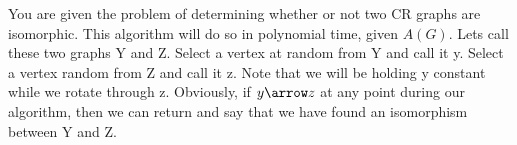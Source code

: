 \documentclass{article}
\begin{document}
You are given the problem of determining whether or not two CR graphs are isomorphic.
This algorithm will do so in polynomial time, given \(A(G)\).  Lets call these two graphs 
Y and Z.  Select a vertex at random from Y and call it y.  Select a vertex random from Z
and call it z.  Note that we will be holding y constant while we rotate through z.  Obviously,
if \(y \arrow z\) at any point during our algorithm, then we can return and say that we have
found an isomorphism between Y and Z.
\end{document}
